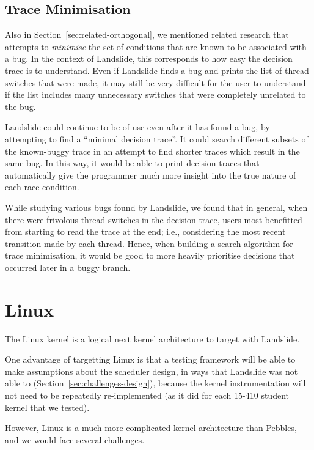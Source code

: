 \subsection{Trace Minimisation}
\label{sec:future-trace-minimisation}

Also in Section~\ref{sec:related-orthogonal}, we mentioned related research that attempts to {\em minimise} the set of conditions that are known to be associated with a bug\cite{dag-mining}.
In the context of Landslide, this corresponds to how easy the decision trace is to understand. Even if Landslide finds a bug and prints the list of thread switches that were made, it may still be very difficult for the user to understand if the list includes many unnecessary switches that were completely unrelated to the bug.

Landslide could continue to be of use even after it has found a bug, by attempting to find a ``minimal decision trace''. It could search different subsets of the known-buggy trace in an attempt to find shorter traces which result in the same bug.
In this way, it would be able to print decision traces that automatically give the programmer much more insight into the true nature of each race condition.

While studying various bugs found by Landslide, we found that in general, when there were frivolous thread switches in the decision trace, users most benefitted from starting to read the trace at the end; i.e., considering the most recent transition made by each thread. Hence, when building a search algorithm for trace minimisation, it would be good to more heavily prioritise decisions that occurred later in a buggy branch.

\section{Linux}
\label{sec:future-linux}

The Linux kernel is a logical next kernel architecture to target with Landslide.

One advantage of targetting Linux is that a testing framework will be able to make assumptions about the scheduler design, in ways that Landslide was not able to (Section~\ref{sec:challenges-design}), because the kernel instrumentation will not need to be repeatedly re-implemented (as it did for each 15-410 student kernel that we tested).

However, Linux is a much more complicated kernel architecture than Pebbles, and we would face several challenges.

